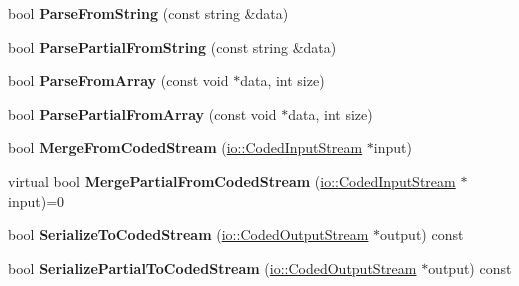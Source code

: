 \begin{DoxyCompactItemize}
bool {\bfseries Parse\+From\+String} (const string \&data)
\item 
\mbox{\label{classgoogle_1_1protobuf_1_1MessageLite_a732c6d389ede422f0fb402734ffedcb7}} 
bool {\bfseries Parse\+Partial\+From\+String} (const string \&data)
\item 
\mbox{\label{classgoogle_1_1protobuf_1_1MessageLite_abe51451e1018838c8ccc353c20cdf73c}} 
bool {\bfseries Parse\+From\+Array} (const void $\ast$data, int size)
\item 
\mbox{\label{classgoogle_1_1protobuf_1_1MessageLite_a8e39016649ce7df865094a6db690ee6b}} 
bool {\bfseries Parse\+Partial\+From\+Array} (const void $\ast$data, int size)
\item 
\mbox{\label{classgoogle_1_1protobuf_1_1MessageLite_a052068e820916c4ea3c0c68d7f32ea64}} 
bool {\bfseries Merge\+From\+Coded\+Stream} (\hyperlink{classgoogle_1_1protobuf_1_1io_1_1CodedInputStream}{io\+::\+Coded\+Input\+Stream} $\ast$input)
\item 
\mbox{\label{classgoogle_1_1protobuf_1_1MessageLite_a3005e1af614c3a90ff6690fa20a5d086}} 
virtual bool {\bfseries Merge\+Partial\+From\+Coded\+Stream} (\hyperlink{classgoogle_1_1protobuf_1_1io_1_1CodedInputStream}{io\+::\+Coded\+Input\+Stream} $\ast$input)=0
\item 
\mbox{\label{classgoogle_1_1protobuf_1_1MessageLite_aa7bd5831ae36fb1a8976ab583c10292c}} 
bool {\bfseries Serialize\+To\+Coded\+Stream} (\hyperlink{classgoogle_1_1protobuf_1_1io_1_1CodedOutputStream}{io\+::\+Coded\+Output\+Stream} $\ast$output) const
\item 
\mbox{\label{classgoogle_1_1protobuf_1_1MessageLite_a71ea1f767477f1f381cf9d0be7d93bda}} 
bool {\bfseries Serialize\+Partial\+To\+Coded\+Stream} (\hyperlink{classgoogle_1_1protobuf_1_1io_1_1CodedOutputStream}{io\+::\+Coded\+Output\+Stream} $\ast$output) const
\item 
\mbox{\label{classgoogle_1_1protobuf_1_1MessageLite_adc826c8b63c32aeda21a17921f30bb93}} 

\end{DoxyCompactItemize}
